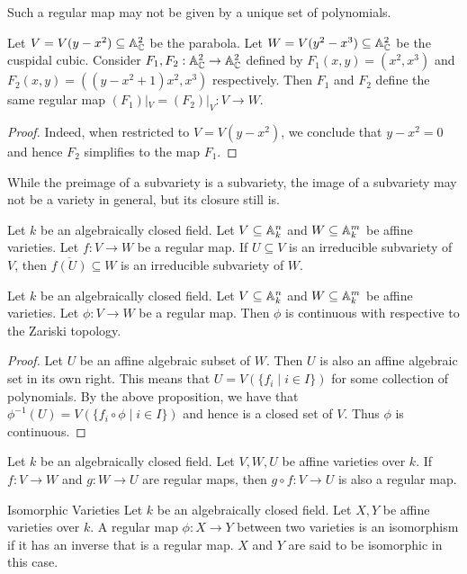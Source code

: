 \documentclass[a4paper]{article}
\begin{document}
Such a regular map may not be given by a unique set of polynomials. 

\begin{eg}{}{} Let $V=V(y-x^2)\subseteq\mathbb{A}_{\mathbb{C}}^2$ be the parabola. Let $W=V(y^2-x^3)\subseteq\mathbb{A}_{\mathbb{C}}^2$ be the cuspidal cubic. Consider $F_1,F_2:\mathbb{A}_{\mathbb{C}}^2\to\mathbb{A}_{\mathbb{C}}^2$ defined by $F_1(x,y)=(x^2,x^3)$ and $F_2(x,y)=((y-x^2+1)x^2,x^3)$ respectively. Then $F_1$ and $F_2$ define the same regular map $(F_1)|_V=(F_2)|_V:V\to W$. \tcbline
\begin{proof}
Indeed, when restricted to $V=V(y-x^2)$, we conclude that $y-x^2=0$ and hence $F_2$ simplifies to the map $F_1$. 
\end{proof}
\end{eg}

While the preimage of a subvariety is a subvariety, the image of a subvariety may not be a variety in general, but its closure still is. 

\begin{lmm}{}{} Let $k$ be an algebraically closed field. Let $V\subseteq\mathbb{A}_k^n$ and $W\subseteq\mathbb{A}_k^m$ be affine varieties. Let $f:V\to W$ be a regular map. If $U\subseteq V$ is an irreducible subvariety of $V$, then $\overline{f(U)}\subseteq W$ is an irreducible subvariety of $W$. 
\end{lmm}

\begin{thm}{}{} Let $k$ be an algebraically closed field. Let $V\subseteq\mathbb{A}_k^n$ and $W\subseteq\mathbb{A}_k^m$ be affine varieties. Let $\phi:V\to W$ be a regular map. Then $\phi$ is continuous with respective to the Zariski topology. \tcbline
\begin{proof}
Let $U$ be an affine algebraic subset of $W$. Then $U$ is also an affine algebraic set in its own right. This means that $U=V(\{f_i\;|\;i\in I\})$ for some collection of polynomials. By the above proposition, we have that $\phi^{-1}(U)=V(\{f_i\circ\phi\;|\;i\in I\})$ and hence is a closed set of $V$. Thus $\phi$ is continuous. 
\end{proof}
\end{thm}

\begin{prp}{}{} Let $k$ be an algebraically closed field. Let $V,W,U$ be affine varieties over $k$. If $f:V\to W$ and $g:W\to U$ are regular maps, then $g\circ f:V\to U$ is also a regular map. 
\end{prp}

\begin{defn}{Isomorphic Varieties}{} Let $k$ be an algebraically closed field. Let $X,Y$ be affine varieties over $k$. A regular map $\phi:X\to Y$ between two varieties is an isomorphism if it has an inverse that is a regular map. $X$ and $Y$ are said to be isomorphic in this case. 
\end{defn}
\end{document}
